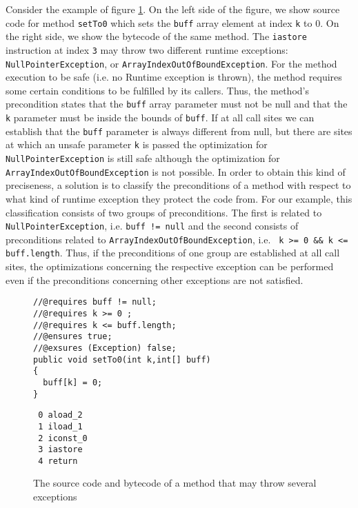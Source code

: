 Consider the example of figure \ref{fig:jmlpreciseex}. On the left side of the figure, we show source code for method \verb!setTo0! which sets the \verb!buff! array element at index \verb!k! to 0. On the right side, we show the bytecode of the same method. The \texttt{iastore} instruction at index \texttt{3} may throw two different runtime exceptions: \texttt{NullPointerException}, or \texttt{ArrayIndexOutOfBoundException}. For the method execution to be safe (i.e. no Runtime exception is thrown), the method requires some certain conditions to be fulfilled by its callers. Thus, the method's precondition states that the \verb!buff! array parameter must not be null and that the \verb!k! parameter must be inside the bounds of \verb!buff!. If at all call sites we can establish that the \verb!buff! parameter is always different from null, but there are sites at which an unsafe parameter \verb!k! is passed the optimization for \texttt{NullPointerException} is still safe although the optimization for \texttt{ArrayIndexOutOfBoundException} is not possible. In order to obtain this kind of preciseness, a solution is to classify the preconditions of a method with respect to what kind of runtime exception they protect the code from. For our example, this classification consists of two groups of preconditions. The first is related to \texttt{NullPointerException}, i.e. \texttt{buff != null} and the second consists of preconditions related to \texttt{ArrayIndexOutOfBoundException}, i.e. \verb! k >= 0 && k <= buff.length!. Thus, if the preconditions of one group are established at all call sites, the optimizations concerning the respective exception can be performed even if the preconditions concerning other exceptions are not satisfied.

\begin{figure}
\begin{minipage}[b]{0.5\linewidth}
\begin{verbatim}
//@requires buff != null;
//@requires k >= 0 ;
//@requires k <= buff.length;
//@ensures true;
//@exsures (Exception) false;
public void setTo0(int k,int[] buff)
{
  buff[k] = 0;
}
\end{verbatim}
\end{minipage}
\hspace{.5cm}
\begin{minipage}[b]{0.4\linewidth}
 \begin{verbatim}
 0 aload_2
 1 iload_1
 2 iconst_0
 3 iastore
 4 return
\end{verbatim}
\end{minipage}
\caption{\sc The source code and bytecode of a method that may throw several exceptions}
\label{fig:jmlpreciseex}
\end{figure}

